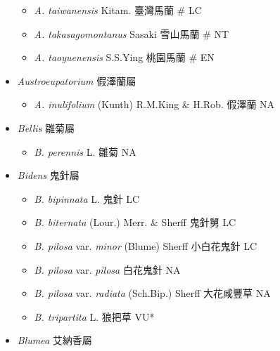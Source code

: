 \begin{itemize}
\begin{itemize}
        \item[] \textit{A. taiwanensis} Kitam.  臺灣馬蘭  \# LC
        \item[] \textit{A. takasagomontanus} Sasaki  雪山馬蘭  \# NT
        \item[] \textit{A. taoyuenensis} S.S.Ying  桃園馬蘭  \# EN
  \end{itemize}
 \item[] \textit{Austroeupatorium} 假澤蘭屬
                                
  \begin{itemize}
        \item[] \textit{A. inulifolium} (Kunth) R.M.King \& H.Rob.  假澤蘭   NA
  \end{itemize}
 \item[] \textit{Bellis} 雛菊屬
                                
  \begin{itemize}
        \item[] \textit{B. perennis} L.  雛菊   NA
  \end{itemize}
 \item[] \textit{Bidens} 鬼針屬
                                
  \begin{itemize}
        \item[] \textit{B. bipinnata} L.  鬼針   LC
        \item[] \textit{B. biternata} (Lour.) Merr. \& Sherff  鬼針舅   LC
        \item[] \textit{B. pilosa} var. \textit{minor} (Blume) Sherff  小白花鬼針   LC
        \item[] \textit{B. pilosa} var. \textit{pilosa}   白花鬼針   NA
        \item[] \textit{B. pilosa} var. \textit{radiata} (Sch.Bip.) Sherff  大花咸豐草   NA
        \item[] \textit{B. tripartita} L.  狼把草   VU*
  \end{itemize}
 \item[] \textit{Blumea} 艾納香屬
                                

\end{itemize}
